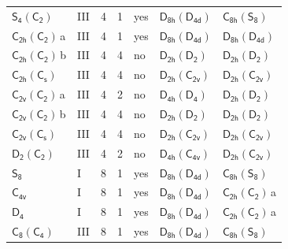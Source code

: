 \documentclass[10pt,a4paper]{article}
\numberwithin{equation}{section}
\newcommand{\grp}[1]{\mathsf{#1}}
\newcommand{\clsletter}[1]{\,{\scriptsize\color{black!55}#1}}
\begin{document}
{\begin{longtable}{@{}llrrlll@{}}
\href{S4-C2.pdf}{$\grp{S_{4}}(\grp{C_{2}})$} & III & 4 & 1 & yes & \href{D8h-D4d.pdf}{$\grp{D_{8h}}(\grp{D_{4d}})$} & \href{C8h-S8.pdf}{$\grp{C_{8h}}(\grp{S_{8}})$}\\
\href{C2h-C2.pdf}{$\grp{C_{2h}}(\grp{C_{2}})$}\clsletter{a} & III & 4 & 1 & yes & \href{D8h-D4d.pdf}{$\grp{D_{8h}}(\grp{D_{4d}})$} & \href{D8h-D4d.pdf}{$\grp{D_{8h}}(\grp{D_{4d}})$}\\
\href{C2h-C2.pdf}{$\grp{C_{2h}}(\grp{C_{2}})$}\clsletter{b} & III & 4 & 4 & no & \href{D2h-D2.pdf}{$\grp{D_{2h}}(\grp{D_{2}})$} & \href{D2h-D2.pdf}{$\grp{D_{2h}}(\grp{D_{2}})$}\\
\href{C2h-C1v.pdf}{$\grp{C_{2h}}(\grp{C_{s}})$} & III & 4 & 4 & no & \href{D2h-C2v.pdf}{$\grp{D_{2h}}(\grp{C_{2v}})$} & \href{D2h-C2v.pdf}{$\grp{D_{2h}}(\grp{C_{2v}})$}\\
\href{C2v-C2.pdf}{$\grp{C_{2v}}(\grp{C_{2}})$}\clsletter{a} & III & 4 & 2 & no & \href{D4h-D4.pdf}{$\grp{D_{4h}}(\grp{D_{4}})$} & \href{D2h-D2.pdf}{$\grp{D_{2h}}(\grp{D_{2}})$}\\
\href{C2v-C2.pdf}{$\grp{C_{2v}}(\grp{C_{2}})$}\clsletter{b} & III & 4 & 4 & no & \href{D2h-D2.pdf}{$\grp{D_{2h}}(\grp{D_{2}})$} & \href{D2h-D2.pdf}{$\grp{D_{2h}}(\grp{D_{2}})$}\\
\href{C2v-C1v.pdf}{$\grp{C_{2v}}(\grp{C_{s}})$} & III & 4 & 4 & no & \href{D2h-C2v.pdf}{$\grp{D_{2h}}(\grp{C_{2v}})$} & \href{D2h-C2v.pdf}{$\grp{D_{2h}}(\grp{C_{2v}})$}\\
\href{D2-C2.pdf}{$\grp{D_{2}}(\grp{C_{2}})$} & III & 4 & 2 & no & \href{D4h-C4v.pdf}{$\grp{D_{4h}}(\grp{C_{4v}})$} & \href{D2h-C2v.pdf}{$\grp{D_{2h}}(\grp{C_{2v}})$}\\
\href{../../../rotation/data/pdf/S8.pdf}{$\grp{S_{8}}$} & I & 8 & 1 & yes & \href{D8h-D4d.pdf}{$\grp{D_{8h}}(\grp{D_{4d}})$} & \href{C8h-S8.pdf}{$\grp{C_{8h}}(\grp{S_{8}})$}\\
\href{../../../rotation/data/pdf/C4v.pdf}{$\grp{C_{4v}}$} & I & 8 & 1 & yes & \href{D8h-D4d.pdf}{$\grp{D_{8h}}(\grp{D_{4d}})$} & \href{C2h-C2.pdf}{$\grp{C_{2h}}(\grp{C_{2}})$}\clsletter{a}\\
\href{../../../rotation/data/pdf/D4.pdf}{$\grp{D_{4}}$} & I & 8 & 1 & yes & \href{D8h-D4d.pdf}{$\grp{D_{8h}}(\grp{D_{4d}})$} & \href{C2h-C2.pdf}{$\grp{C_{2h}}(\grp{C_{2}})$}\clsletter{a}\\
\href{C8-C4.pdf}{$\grp{C_{8}}(\grp{C_{4}})$} & III & 8 & 1 & yes & \href{D8h-D4d.pdf}{$\grp{D_{8h}}(\grp{D_{4d}})$} & \href{C8h-S8.pdf}{$\grp{C_{8h}}(\grp{S_{8}})$}\\

\end{longtable}}
\end{document}
